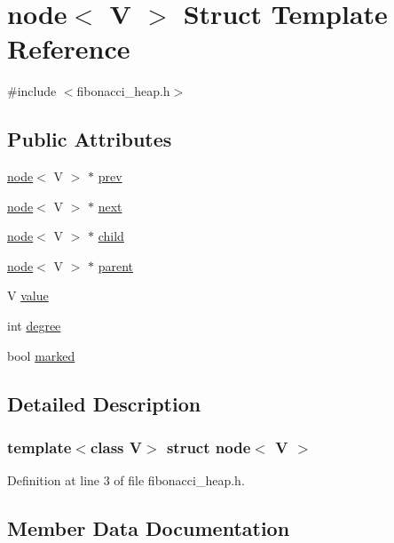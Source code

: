 \hypertarget{structnode}{}\section{node$<$ V $>$ Struct Template Reference}
\label{structnode}


{\ttfamily \#include $<$fibonacci\+\_\+heap.\+h$>$}

\subsection*{Public Attributes}
\begin{DoxyCompactItemize}
\item 
\hyperlink{structnode}{node}$<$ V $>$ $\ast$ \hyperlink{structnode_a203e6d9b472c65ef97d3acd4b961b301}{prev}
\item 
\hyperlink{structnode}{node}$<$ V $>$ $\ast$ \hyperlink{structnode_a5c15f160b3b242d1ee025bdb67c9c798}{next}
\item 
\hyperlink{structnode}{node}$<$ V $>$ $\ast$ \hyperlink{structnode_a4b6a5eded3c2188e96413a620a748d83}{child}
\item 
\hyperlink{structnode}{node}$<$ V $>$ $\ast$ \hyperlink{structnode_afb2d1d451cf8cea46087ce30258499ca}{parent}
\item 
V \hyperlink{structnode_a1a2d957a20bcdfbf21dcb73e2378a5ea}{value}
\item 
int \hyperlink{structnode_ab9c3a691bf0c39288401ae0056b6b0cc}{degree}
\item 
bool \hyperlink{structnode_a6800b687c66c2087c17d541af91184ff}{marked}
\end{DoxyCompactItemize}


\subsection{Detailed Description}
\subsubsection*{template$<$class V$>$\newline
struct node$<$ V $>$}



Definition at line 3 of file fibonacci\+\_\+heap.\+h.



\subsection{Member Data Documentation}
\mbox{\label{structnode_a4b6a5eded3c2188e96413a620a748d83}} 
